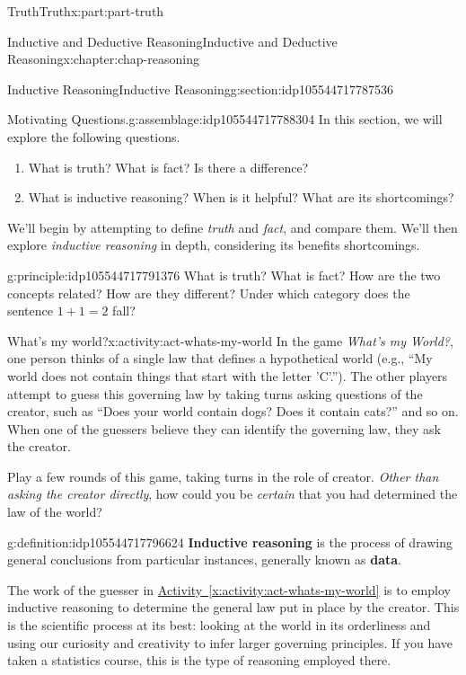 \documentclass[oneside,10pt,]{book}
\newcommand{\xreffont}{\relax}
\newcommand{\terminology}[1]{\textbf{#1}}
\numberwithin{equation}{section}
\begin{document}
\begin{partptx}{Truth}{}{Truth}{}{}{x:part:part-truth}
\begin{chapterptx}{Inductive and Deductive Reasoning}{}{Inductive and Deductive Reasoning}{}{}{x:chapter:chap-reasoning}
\begin{sectionptx}{Inductive Reasoning}{}{Inductive Reasoning}{}{}{g:section:idp105544717787536}
\begin{assemblage}{Motivating Questions.}{g:assemblage:idp105544717788304}%
In this section, we will explore the following questions. %
\begin{enumerate}
\item{}What is truth? What is fact? Is there a difference?%
\item{}What is inductive reasoning? When is it helpful? What are its shortcomings?%
\end{enumerate}
%
\end{assemblage}
We'll begin by attempting to define \emph{truth} and \emph{fact}, and compare them. We'll then explore \emph{inductive reasoning} in depth, considering its benefits shortcomings.%
\begin{principle}{}{}{g:principle:idp105544717791376}%
What is truth? What is fact? How are the two concepts related? How are they different? Under which category does the sentence \(1+1=2\) fall?%
\end{principle}
\begin{activity}{What's my world?}{x:activity:act-whats-my-world}%
In the game \emph{What's my World?}, one person thinks of a single law that defines a hypothetical world (e.g., ``My world does not contain things that start with the letter 'C'.''). The other players attempt to guess this governing law by taking turns asking questions of the creator, such as ``Does your world contain dogs? Does it contain cats?'' and so on. When one of the guessers believe they can identify the governing law, they ask the creator.%
\par
Play a few rounds of this game, taking turns in the role of creator. \emph{Other than asking the creator directly}, how could you be \emph{certain} that you had determined the law of the world?%
\end{activity}%
\begin{definition}{}{g:definition:idp105544717796624}%
%
\terminology{Inductive reasoning} is the process of drawing general conclusions from particular instances, generally known as \terminology{data}.%
\end{definition}
The work of the guesser in \hyperref[x:activity:act-whats-my-world]{Activity~{\xreffont\ref{x:activity:act-whats-my-world}}} is to employ inductive reasoning to determine the general law put in place by the creator. This is the scientific process at its best: looking at the world in its orderliness and using our curiosity and creativity to infer larger governing principles. If you have taken a statistics course, this is the type of reasoning employed there.%

\end{sectionptx}
\end{chapterptx}
\end{partptx}
\end{document}
